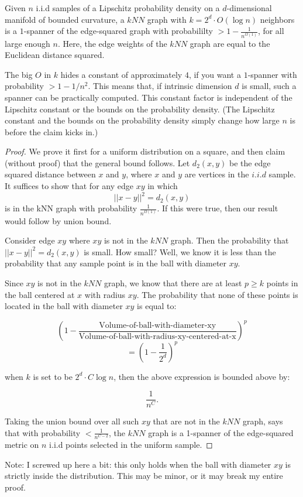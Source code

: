 

\begin{theorem} Given $n$ i.i.d samples of a Lipschitz probability
density on a $d$-dimensional manifold of bounded curvature,
a $kNN$ graph with $k = 2^d \cdot O(\log n)$ neighbors is a $1$-spanner of
the edge-squared graph with
probabililty $ > 1-\frac{1}{n^{\Omega(1)}}$, for all large enough $n$. Here, the
edge weights of the $kNN$ graph are equal to the Euclidean distance
squared.
\end{theorem}

The big $O$ in $k$ hides a
constant of approximately $4$, if you want a $1$-spanner with probability
$> 1 - 1/n^2$. This means that, if intrinsic dimension $d$ is small, such a spanner can be
practically computed. This constant factor is independent of the Lipschitz constant or the bounds on the
probability density. (The Lipschitz constant and the bounds on the
    probability density simply change how large $n$ is before the claim
    kicks in.)

\begin{proof}
We prove it first for a uniform distribution on a square,
   and then claim (without proof) that the general bound follows.
Let $d_2(x,y)$ be the edge squared distance between $x$ and $y$, where
$x$ and $y$ are vertices in the $i.i.d$ sample.
  It suffices to show that for any edge $xy$ in which
\[ ||x-y||^2 = d_2(x,y) \]
is in the kNN graph with probability $\frac{1}{n^{\Omega(1)}}$.
If this were true, then our result would follow by union bound.

Consider edge $xy$ where $xy$ is not in the $kNN$ graph. Then the
probability that $||x-y||^2 = d_2(x,y)$ is small. How small? Well, we
know it is less than the probability that any sample point 
is in the ball with diameter $xy$. 

Since $xy$ is not in the $kNN$ graph, we know that there are at least
$p \geq k$ points in the ball centered at $x$ with radius $xy$.  The
probability that none of these points is located in the ball with
diameter $xy$ is equal to:

\[\left(1 - \frac
 {\text{Volume-of-ball-with-diameter-xy}}
 {\text{Volume-of-ball-with-radius-xy-centered-at-x}}\right)^p
\]
\[ = \left( 1-\frac{1}{2^d} \right)^p  \]

when $k$ is set to be $2^d \cdot C \log n$, then the above expression is
bounded above by:

\[ \frac{1}{n^C}. \]

Taking the union bound over all such $xy$ that are not in the $kNN$
graph, says that with probability $< \frac{1}{n^{C-2}}$, the $kNN$ graph
is a 1-spanner of the edge-squared metric on $n$ i.i.d points selected
in the uniform sample.


\end{proof}
Note: I screwed up here a bit: this only holds when the ball with
diameter $xy$ is strictly inside the distribution. This may be minor, or
it may break my entire proof.


